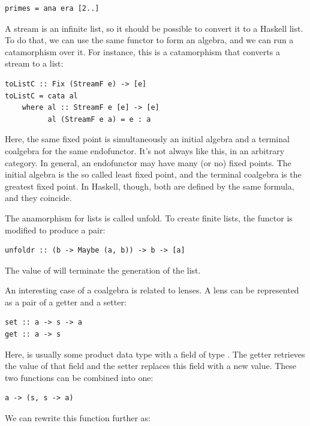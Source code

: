 \begin{Verbatim}[commandchars=\\\{\}]
primes = ana era [2..]
\end{Verbatim}
A stream is an infinite list, so it should be possible to convert it to
a Haskell list. To do that, we can use the same functor 
to form an algebra, and we can run a catamorphism over it. For instance,
this is a catamorphism that converts a stream to a list:

\begin{Verbatim}[commandchars=\\\{\}]
toListC :: Fix (StreamF e) -> [e]
toListC = cata al
    where al :: StreamF e [e] -> [e] 
          al (StreamF e a) = e : a
\end{Verbatim}
Here, the same fixed point is simultaneously an initial algebra and a
terminal coalgebra for the same endofunctor. It's not always like this,
in an arbitrary category. In general, an endofunctor may have many (or
no) fixed points. The initial algebra is the so called least fixed
point, and the terminal coalgebra is the greatest fixed point. In
Haskell, though, both are defined by the same formula, and they
coincide.

The anamorphism for lists is called unfold. To create finite lists, the
functor is modified to produce a  pair:

\begin{Verbatim}[commandchars=\\\{\}]
unfoldr :: (b -> Maybe (a, b)) -> b -> [a]
\end{Verbatim}
The value of  will terminate the generation of the list.

An interesting case of a coalgebra is related to lenses. A lens can be
represented as a pair of a getter and a setter:

\begin{Verbatim}[commandchars=\\\{\}]
set :: a -> s -> a
get :: a -> s
\end{Verbatim}
Here,  is usually some product data type with a field of type
. The getter retrieves the value of that field and the setter
replaces this field with a new value. These two functions can be
combined into one:

\begin{Verbatim}[commandchars=\\\{\}]
a -> (s, s -> a)
\end{Verbatim}
We can rewrite this function further as:

